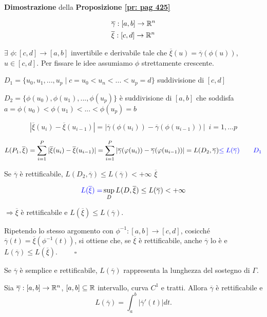 \begin{dembar}
	\textbf{Dimostrazione} della \textbf{Proposizione \ref{pr: pag 425}}
	
	\begin{align*}
		&\overline{\gamma}:[a,b]\rightarrow \R^n\\
		&\overline{\xi}:[c,d]\rightarrow \R^n
	\end{align*}
	
	$\exists \,\,\phi: [c,d]\rightarrow [a,b]$ invertibile e derivabile tale che $\overline{\xi}(u)=\overline{\gamma}(\phi(u))$, $u \in [c,d]$. Per fissare le idee assumiamo $\phi$ strettamente crescente.
	
	$D_1=\{ u_0,u_1,...,u_p \mid c=u_0<u_n<...<u_p=d \}$ suddivisione di $[c,d]$
	
	$D_2=\{\phi(u_0),\phi(u_1),...,\phi(u_p)\}$ è suddivisione di $[a,b]$ che soddisfa \\%
	$a = \phi (u_0)<\phi(u_1)<...<\phi(u_p)=b$
	
	$$|\overline{\xi} (u_i)-\overline{\xi}(u_{i-1})|=|\overline{\gamma}(\phi(u_i))-\overline{\gamma}(\phi(u_{i-1}))|\,\,\, i=1,...p$$
	
	$$L(P_1,\overline{\xi})=\sum_{i=1}^P|\overline{\xi}(u_i)-\overline{\xi}(u_{i-1})|=\sum_{i=1}^P|\overline{\gamma}(\phi(u_i))-\overline{\gamma}(\phi(u_{i-1}))|=L(D_2,\overline{\gamma}) {\color{blue} \leq L(\overline{\gamma}) \qquad D_1}$$
	
	Se $\overline{\gamma}$ è rettificabile, $L(D_2,\overline{\gamma})\leq L(\overline{\gamma}) < +\infty$ $\overline{\xi}$ 
	
	$${\color{blue} L(\overline{\xi})=} \sup_D L(D, \overline{\xi}) \leq L(\overline{\gamma}) < + \infty$$
	
	$\Rightarrow \overline{\xi}$ è rettificabile e $L(\overline{\xi})\leq L(\overline{\gamma})$.
	
	Ripetendo lo stesso argomento con $\phi^{-1}:[a,b]\rightarrow [c,d]$, cosicché $\overline{\gamma}(t)=\overline{\xi}(\phi^{-1}(t))$, si ottiene che, se $\overline{\xi}$ è rettificabile, anche $\overline{\gamma}$ lo è e $L(\overline{\gamma})\leq L(\overline{\xi})$. $\qquad \square$
\end{dembar}


\begin{attbar}
	Se $\overline{\gamma}$ è semplice e rettificabile, $L(\overline{\gamma})$ rappresenta la lunghezza del sostegno di $\Gamma$.
\end{attbar}


\begin{theorem}
	Sia $\overline{\gamma}:[a,b]\rightarrow \R^n$, $[a,b] \subseteq \R$ intervallo, curva $C^1$ e tratti. Allora $\overline{\gamma}$ è rettificabile e 
	\begin{equation*}
		L(\overline{\gamma})=\int_{a}^{b}|\overline{\gamma}'(t)|dt.
	\end{equation*}
\end{theorem}


